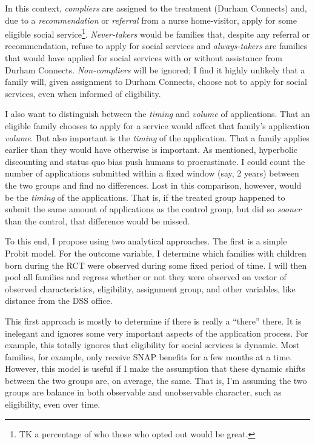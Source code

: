 \documentclass[12pt,letterpaperpaper,]{book}
\begin{document}
In this context, \emph{compliers} are assigned to the treatment (Durham
Connects) and, due to a \emph{recommendation} or \emph{referral} from a
nurse home-visitor, apply for some eligible social service\footnote{TK a
  percentage of who those who opted out would be great.}.
\emph{Never-takers} would be families that, despite any referral or
recommendation, refuse to apply for social services and
\emph{always-takers} are families that would have applied for social
services with or without assistance from Durham Connects.
\emph{Non-compliers} will be ignored; I find it highly unlikely that a
family will, given assignment to Durham Connects, choose not to apply
for social services, even when informed of eligibility.

I also want to distinguish between the \emph{timing} and \emph{volume}
of applications. That an eligible family chooses to apply for a service
would affect that family's application \emph{volume}. But also important
is the \emph{timing} of the application. That a family applies earlier
than they would have otherwise is important. As mentioned, hyperbolic
discounting and status quo bias push humans to procrastinate. I could
count the number of applications submitted within a fixed window (say, 2
years) between the two groups and find no differences. Lost in this
comparison, however, would be the \emph{timing} of the applications.
That is, if the treated group happened to submit the same amount of
applications as the control group, but did so \emph{sooner} than the
control, that difference would be missed.

To this end, I propose using two analytical approaches. The first is a
simple Probit model. For the outcome variable, I determine which
families with children born during the RCT were observed during some
fixed period of time. I will then pool all families and regress whether
or not they were observed on vector of observed characteristics,
eligibility, assignment group, and other variables, like distance from
the DSS office.

This first approach is mostly to determine if there is really a
``there'' there. It is inelegant and ignores some very important aspects
of the application process. For example, this totally ignores that
eligibility for social services is dynamic. Most families, for example,
only receive SNAP benefits for a few months at a time. However, this
model is useful if I make the assumption that these dynamic shifts
between the two groups are, on average, the same. That is, I'm assuming
the two groups are balance in both observable and unobservable
character, such as eligibility, even over time.
\end{document}
